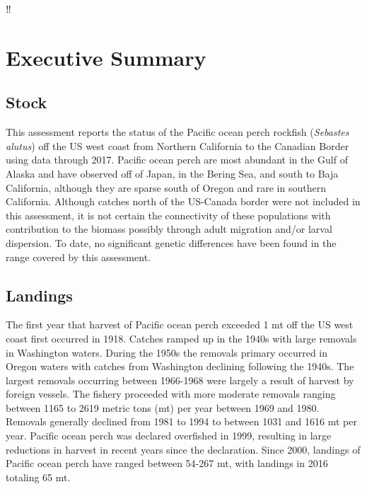 \documentclass[12pt,]{article}
\begin{document}
{
\setcounter{tocdepth}{4}
\tableofcontents
}
\setlength{\parskip}{5mm plus1mm minus1mm} \pagebreak

\setcounter{page}{1} \renewcommand{\thefigure}{\alph{figure}}
‼\renewcommand{\thetable}{\alph{table}}

\section*{Executive Summary}\label{executive-summary}

\subsection*{Stock}\label{stock}

This assessment reports the status of the Pacific ocean perch rockfish
(\emph{Sebastes alutus}) off the US west coast from Northern California
to the Canadian Border using data through 2017. Pacific ocean perch are
most abundant in the Gulf of Alaska and have observed off of Japan, in
the Bering Sea, and south to Baja California, although they are sparse
south of Oregon and rare in southern California. Although catches north
of the US-Canada border were not included in this assessment, it is not
certain the connectivity of these populations with contribution to the
biomass possibly through adult migration and/or larval dispersion. To
date, no significant genetic differences have been found in the range
covered by this assessment.

\subsection*{Landings}\label{landings}

The first year that harvest of Pacific ocean perch exceeded 1 mt off the
US west coast first occurred in 1918. Catches ramped up in the 1940s
with large removals in Washington waters. During the 1950s the removals
primary occurred in Oregon waters with catches from Washington declining
following the 1940s. The largest removals occurring between 1966-1968
were largely a result of harvest by foreign vessels. The fishery
proceeded with more moderate removals ranging between 1165 to 2619
metric tons (mt) per year between 1969 and 1980. Removals generally
declined from 1981 to 1994 to between 1031 and 1616 mt per year. Pacific
ocean perch was declared overfished in 1999, resulting in large
reductions in harvest in recent years since the declaration. Since 2000,
landings of Pacific ocean perch have ranged between 54-267 mt, with
landings in 2016 totaling 65 mt.
\end{document}
